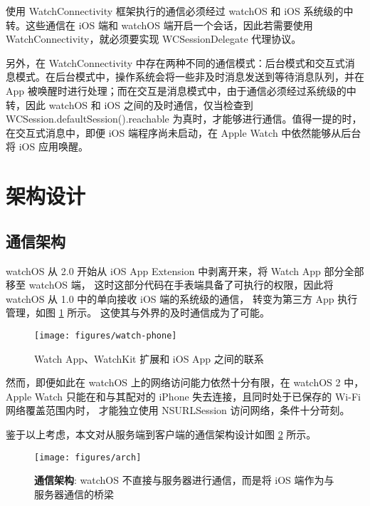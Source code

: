 使用 WatchConnectivity 框架执行的通信必须经过 watchOS 和 iOS 系统级的中转。这些通信在 iOS 端和 watchOS 端开启一个会话，因此若需要使用 WatchConnectivity，就必须要实现 WCSessionDelegate 代理协议。

另外，在 WatchConnectivity 中存在两种不同的通信模式：后台模式和交互式消息模式。在后台模式中，操作系统会将一些非及时消息发送到等待消息队列，并在 App 被唤醒时进行处理；而在交互是消息模式中，由于通信必须经过系统级的中转，因此 watchOS 和 iOS 之间的及时通信，仅当检查到 WCSession.defaultSession().reachable 为真时，才能够进行通信。值得一提的时，在交互式消息中，即便 iOS 端程序尚未启动，在 Apple Watch 中依然能够从后台将 iOS 应用唤醒。

\section{架构设计}
\label{sec:arch-design}

\subsection{通信架构}
\label{sub:im-arch}

watchOS 从 2.0 开始从 iOS App Extension 中剥离开来，将 Watch App 部分全部移至 watchOS 端，
这时这部分代码在手表端具备了可执行的权限，因此将 watchOS 从 1.0 中的单向接收 iOS 端的系统级的通信，
转变为第三方 App 执行管理\cite{WatchGuide:2016}，如图 \ref{fig:watch-phone} 所示。
这使其与外界的及时通信成为了可能。

\begin{figure}[H]
    \kaishu
    \centering
    \texttt{[image: figures/watch-phone]}
    \caption{\kaishu Watch App、WatchKit 扩展和 iOS App 之间的联系}
    \label{fig:watch-phone}
\end{figure}

然而，即便如此在 watchOS 上的网络访问能力依然十分有限，在 watchOS 2 中，
Apple Watch 只能在和与其配对的 iPhone 失去连接，且同时处于已保存的 Wi-Fi 网络覆盖范围内时，
才能独立使用 NSURLSession 访问网络，条件十分苛刻。

鉴于以上考虑，本文对从服务端到客户端的通信架构设计如图 \ref{fig:im-arch} 所示。

\begin{figure}[H]
    \kaishu
    \centering
    \texttt{[image: figures/arch]}
    \caption{\kaishu \textbf{通信架构}: watchOS 不直接与服务器进行通信，而是将 iOS 端作为与服务器通信的桥梁}
    \label{fig:im-arch}
\end{figure}

